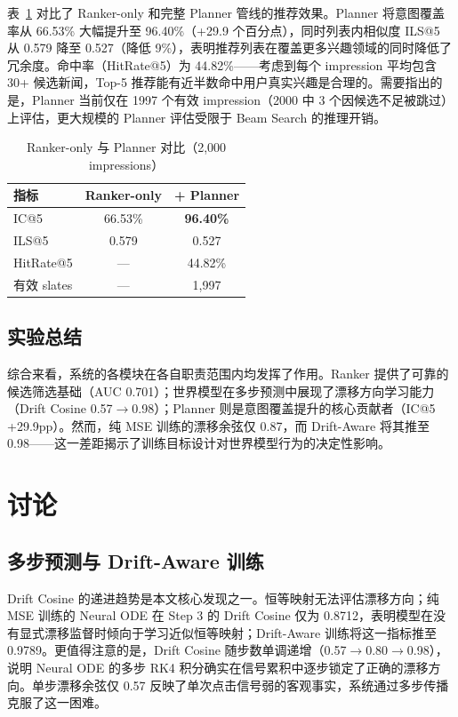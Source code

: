 \documentclass[twocolumn,10pt,a4paper]{ctexart}
\begin{document}
表~\ref{tab:planner} 对比了 Ranker-only 和完整 Planner 管线的推荐效果。Planner 将意图覆盖率从 66.53\% 大幅提升至 96.40\%（+29.9 个百分点），同时列表内相似度 ILS@5 从 0.579 降至 0.527（降低 9\%），表明推荐列表在覆盖更多兴趣领域的同时降低了冗余度。命中率（HitRate@5）为 44.82\%——考虑到每个 impression 平均包含 30+ 候选新闻，Top-5 推荐能有近半数命中用户真实兴趣是合理的。需要指出的是，Planner 当前仅在 1997 个有效 impression（2000 中 3 个因候选不足被跳过）上评估，更大规模的 Planner 评估受限于 Beam Search 的推理开销。

\begin{table}[H]
\centering
\caption{Ranker-only 与 Planner 对比（2,000 impressions）}
\label{tab:planner}
\small
\begin{tabular}{@{}lcc@{}}
\toprule
指标 & Ranker-only & + Planner \\
\midrule
IC@5 & 66.53\% & \textbf{96.40\%} \\
ILS@5 & 0.579 & 0.527 \\
HitRate@5 & --- & 44.82\% \\
有效 slates & --- & 1,997 \\
\bottomrule
\end{tabular}
\end{table}

\subsection{实验总结}

综合来看，系统的各模块在各自职责范围内均发挥了作用。Ranker 提供了可靠的候选筛选基础（AUC 0.701）；世界模型在多步预测中展现了漂移方向学习能力（Drift Cosine 0.57$\to$0.98）；Planner 则是意图覆盖提升的核心贡献者（IC@5 +29.9pp）。然而，纯 MSE 训练的漂移余弦仅 0.87，而 Drift-Aware 将其推至 0.98——这一差距揭示了训练目标设计对世界模型行为的决定性影响。

\section{讨论}

\subsection{多步预测与 Drift-Aware 训练}

Drift Cosine 的递进趋势是本文核心发现之一。恒等映射无法评估漂移方向；纯 MSE 训练的 Neural ODE 在 Step 3 的 Drift Cosine 仅为 0.8712，表明模型在没有显式漂移监督时倾向于学习近似恒等映射；Drift-Aware 训练将这一指标推至 0.9789。更值得注意的是，Drift Cosine 随步数单调递增（0.57$\to$0.80$\to$0.98），说明 Neural ODE 的多步 RK4 积分确实在信号累积中逐步锁定了正确的漂移方向。单步漂移余弦仅 0.57 反映了单次点击信号弱的客观事实，系统通过多步传播克服了这一困难。
\end{document}
